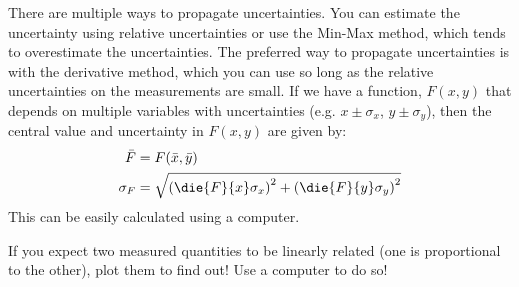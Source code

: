 \begin{chapterSummary}
{There are multiple ways to propagate uncertainties. You can estimate the uncertainty using relative uncertainties or use the Min-Max method, which tends to overestimate the uncertainties. The preferred way to propagate uncertainties is with the derivative method, which you can use so long as the relative uncertainties on the measurements are small. If we have a function, $F(x,y)$ that depends on multiple variables with uncertainties (e.g. $x\pm\sigma_x$, $y\pm\sigma_y$), then the central value and uncertainty in $F(x,y)$ are given by:
\begin{align*}
\bar F &= F(\bar x, \bar y) \nonumber \\
\sigma_F &= \sqrt{\left(\die{F}{x}\sigma_x \right)^2 + \left(\die{F}{y}\sigma_y \right)^2 }
\end{align*}
This can be easily calculated using a computer. 

If you expect two measured quantities to be linearly related (one is proportional to the other), plot them to find out! Use a computer to do so!
}
\end{chapterSummary}

